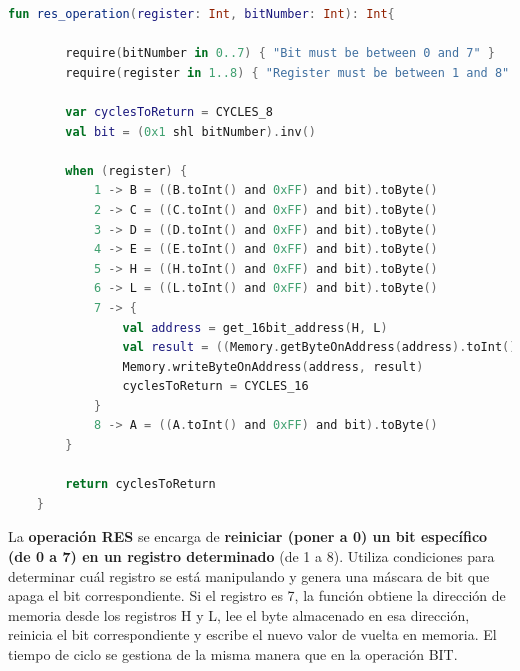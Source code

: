 \begin{lstlisting}[language=Kotlin, caption={Operación RES}, label={code:kotlinres}]
    fun res_operation(register: Int, bitNumber: Int): Int{

        require(bitNumber in 0..7) { "Bit must be between 0 and 7" }
        require(register in 1..8) { "Register must be between 1 and 8" }

        var cyclesToReturn = CYCLES_8
        val bit = (0x1 shl bitNumber).inv()

        when (register) {
            1 -> B = ((B.toInt() and 0xFF) and bit).toByte()
            2 -> C = ((C.toInt() and 0xFF) and bit).toByte()
            3 -> D = ((D.toInt() and 0xFF) and bit).toByte()
            4 -> E = ((E.toInt() and 0xFF) and bit).toByte()
            5 -> H = ((H.toInt() and 0xFF) and bit).toByte()
            6 -> L = ((L.toInt() and 0xFF) and bit).toByte()
            7 -> {
                val address = get_16bit_address(H, L)
                val result = ((Memory.getByteOnAddress(address).toInt() and 0xFF) and bit).toByte()
                Memory.writeByteOnAddress(address, result)
                cyclesToReturn = CYCLES_16
            }
            8 -> A = ((A.toInt() and 0xFF) and bit).toByte()
        }

        return cyclesToReturn
    }
\end{lstlisting}

La \textbf{operación RES} se encarga de \textbf{reiniciar (poner a 0) un bit específico (de 0 a 7) en un registro determinado} (de 1 a 8). Utiliza condiciones para determinar cuál registro se está manipulando y genera una máscara de bit que apaga el bit correspondiente. Si el registro es 7, la función obtiene la dirección de memoria desde los registros H y L, lee el byte almacenado en esa dirección, reinicia el bit correspondiente y escribe el nuevo valor de vuelta en memoria. El tiempo de ciclo se gestiona de la misma manera que en la operación BIT.

